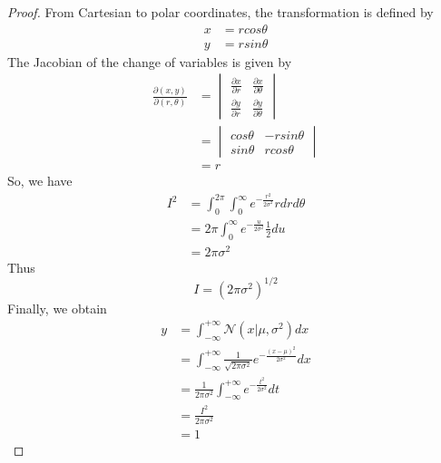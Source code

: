 \documentclass[12pt, a4paper]{article}
\newenvironment{exercise}[2][Ex]{\begin{trivlist}
\item[\hskip \labelsep {\bfseries #1}\hskip \labelsep {\bfseries #2.}]}{\end{trivlist}}
\begin{document}
\begin{exercise}{1.7(**)}
    \begin{proof}
        From Cartesian to polar coordinates, the transformation is defined by
        \begin{equation*}
            \begin{split}
                x&=rcos\theta\\
                y&=rsin\theta
            \end{split}
        \end{equation*}
        The Jacobian of the change of variables is given by
        \begin{align*}
            \frac{\partial(x,y)}{\partial(r,\theta)}&=\begin{vmatrix}
                \frac{\partial x}{\partial r}&\frac{\partial x}{\partial \theta}\\
                \frac{\partial y}{\partial r}&\frac{\partial y}{\partial \theta}
            \end{vmatrix}\\
            &=\begin{vmatrix}
                cos\theta & -rsin\theta\\
                sin\theta & rcos\theta
            \end{vmatrix}\\
            &=r
        \end{align*}
        So, we have
        \begin{align*}
            I^2&=\int_0^{2\pi}\int_0^\infty e^{-\frac{r^2}{2\sigma^2}}rdrd\theta\\
            &=2\pi\int_0^\infty e^{-\frac{u}{2\sigma^2}}\frac{1}{2}du\\
            &=2\pi\sigma^2
        \end{align*}
        Thus
        \begin{equation}
            \label{eqI}
            I=(2\pi\sigma^2)^{1/2}
        \end{equation}
        Finally, we obtain
        \begin{align*}
            y&=\int_{-\infty}^{+\infty}\mathcal{N}(x|\mu,\sigma^2)dx\\
            &=\int_{-\infty}^{+\infty}\frac{1}{\sqrt{2\pi\sigma^2}}e^{-\frac{(x-\mu)^2}
            {2\sigma^2}}dx\\
            &=\frac{1}{2\pi\sigma^2}\int_{-\infty}^{+\infty}e^{-\frac{t^2}{2\sigma^2}}dt\\
            &=\frac{I^2}{2\pi\sigma^2}\\
            &=1
        \end{align*}
    \end{proof}
\end{exercise}
\end{document}
